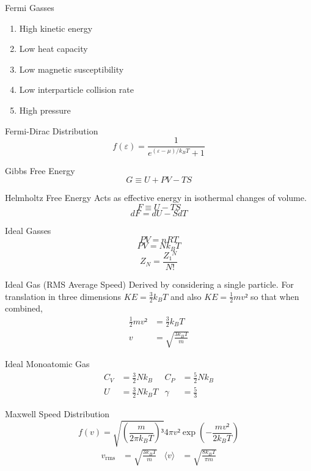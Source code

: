 \documentclass[avery5371]{flashcards}
\begin{document}
\begin{flashcard}{Fermi Gasses}
	\begin{enumerate}
		\item High kinetic energy
		\item Low heat capacity
		\item Low magnetic susceptibility
		\item Low interparticle collision rate
		\item High pressure
	\end{enumerate}
\end{flashcard}

\begin{flashcard}{Fermi-Dirac Distribution}
	\[ f(ε) = \frac{1}{e^{(ε-μ)/k_B T} + 1} \]
\end{flashcard}

\begin{flashcard}{Gibbs Free Energy}
	\[ G ≡ U + PV - TS \]
\end{flashcard}

\begin{flashcard}{Helmholtz Free Energy}
	Acts as effective energy in isothermal changes of volume.
	\[ F ≡ U - TS \]
	\[ dF = dU - S dT \]
\end{flashcard}

\begin{flashcard}{Ideal Gasses}
	\[ PV = nRT \]
	\[ PV = N k_B T \]
	\[ Z_N = \frac{Z₁^N}{N!} \]	
\end{flashcard}

\begin{flashcard}{Ideal Gas (RMS Average Speed)}
	Derived by considering a single particle. For translation in three
	dimensions $KE = \frac 32 k_B T$  and also $KE = \frac 12 mv²$ so that
	when combined,
	\begin{align*}
		\frac 12 mv² &= \frac 32 k_B T \\
		v &= \sqrt{\frac{3 k_B T}{m}}
	\end{align*}
\end{flashcard}

\begin{flashcard}{Ideal Monoatomic Gas}
	\begin{align*}
		C_V &= \frac 32 Nk_B
			& C_P &= \frac 52 Nk_B \\
		U &= \frac 32 Nk_B T
			& γ &= \frac 53
	\end{align*}
\end{flashcard}

\begin{flashcard}{Maxwell Speed Distribution}
	\[ f(v) = \sqrt{ (\frac{m}{2π k_B T})³ } 4πv² \exp(-\frac{mv²}{2k_B T}) \]
	\begin{align*}
		v_\mathrm{rms} &= \sqrt{\frac{3k_B T}{m}}
			& ⟨v⟩ &= \sqrt{\frac{8k_B T}{πm}}
	\end{align*}
\end{flashcard}
\end{document}
